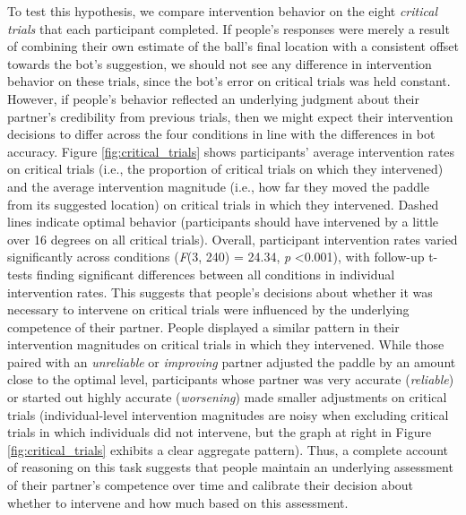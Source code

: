 \documentclass[10pt,letterpaper]{article}
\begin{document}
To test this hypothesis, we compare intervention behavior on the eight \textit{critical trials} that each participant completed. If people's responses were merely a result of combining their own estimate of the ball's final location with a consistent offset towards the bot's suggestion, we should not see any difference in intervention behavior on these trials, since the bot's error on critical trials was held constant. However, if people's behavior reflected an underlying judgment about their partner's credibility from previous trials, then we might expect their intervention decisions to differ across the four conditions in line with the differences in bot accuracy. Figure \ref{fig:critical_trials} shows participants' average intervention rates on critical trials (i.e., the proportion of critical trials on which they intervened) and the average intervention magnitude (i.e., how far they moved the paddle from its suggested location) on critical trials in which they intervened. Dashed lines indicate optimal behavior (participants should have intervened by a little over 16 degrees on all critical trials). Overall, participant intervention rates varied significantly across conditions (\textit{F}(3, 240) = 24.34, \textit{p} \textless{0.001}), with follow-up t-tests finding significant differences between all conditions in individual intervention rates. This suggests that people's decisions about whether it was necessary to intervene on critical trials were influenced by the underlying competence of their partner. People displayed a similar pattern in their intervention magnitudes on critical trials in which they intervened. While those paired with an \textit{unreliable} or \textit{improving} partner adjusted the paddle by an amount close to the optimal level, participants whose partner was very accurate (\textit{reliable}) or started out highly accurate (\textit{worsening}) made smaller adjustments on critical trials (individual-level intervention magnitudes are noisy when excluding critical trials in which individuals did not intervene, but the graph at right in Figure \ref{fig:critical_trials} exhibits a clear aggregate pattern). Thus, a complete account of  reasoning on this task suggests that people maintain an underlying assessment of their partner's competence over time and calibrate their decision about whether to intervene and how much based on this assessment.
\end{document}
